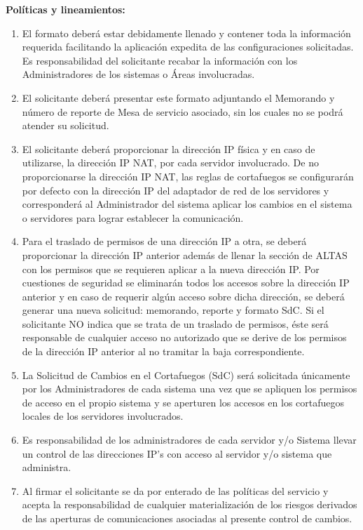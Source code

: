 \documentclass[letterpaper,11pt,landscape]{article}
\begin{document}
\par 
\clearpage
\textbf{\large Políticas y lineamientos:}
{ \small \begin{enumerate}
	        \item El formato deberá estar debidamente llenado y contener toda la información requerida facilitando la aplicación expedita de las configuraciones solicitadas. Es responsabilidad del solicitante recabar la información con los Administradores de los sistemas o Áreas involucradas.
			\item El solicitante deberá presentar este formato adjuntando el Memorando y número de reporte de Mesa de servicio asociado, sin los cuales no se podrá atender su solicitud.
			\item El solicitante deberá proporcionar la dirección IP física y en caso de utilizarse, la dirección IP NAT, por cada servidor involucrado. De no proporcionarse la dirección IP NAT, las reglas de cortafuegos se configurarán por defecto con la dirección IP del adaptador de red de los servidores y corresponderá al Administrador del sistema aplicar los cambios en el sistema o servidores para lograr establecer la comunicación.
			\item Para el traslado de permisos de una dirección IP a otra, se deberá proporcionar la dirección IP anterior además de llenar la sección de ALTAS con los permisos que se requieren aplicar a la nueva dirección IP. Por cuestiones de seguridad se eliminarán todos los accesos sobre la dirección IP anterior y en caso de requerir algún acceso sobre dicha dirección, se deberá generar una nueva solicitud: memorando, reporte y formato SdC. Si el solicitante NO indica que se trata de un traslado de permisos, éste será responsable de cualquier acceso no autorizado que se derive de los permisos de la dirección IP anterior al no tramitar la baja correspondiente.
			\item La Solicitud de Cambios en el Cortafuegos (SdC) será solicitada únicamente por los Administradores de cada sistema una vez que se apliquen los permisos de acceso en el propio sistema y se aperturen los accesos en los cortafuegos locales de los servidores involucrados.
			\item Es responsabilidad de los administradores de cada servidor y/o Sistema llevar un control de las direcciones IP’s con acceso al servidor y/o sistema que administra.
			\item Al firmar el solicitante se da por enterado de las políticas del servicio y acepta la responsabilidad de cualquier materialización de los riesgos derivados de las aperturas de comunicaciones asociadas al presente control de cambios.


\end{enumerate}}
\end{document}

